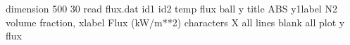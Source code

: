 dimension 500 30
read flux.dat id1 id2 temp flux ball y
title ABS
y1label N2 volume fraction,%
xlabel Flux (kW/m**2)
characters X all
lines blank all
plot y flux
